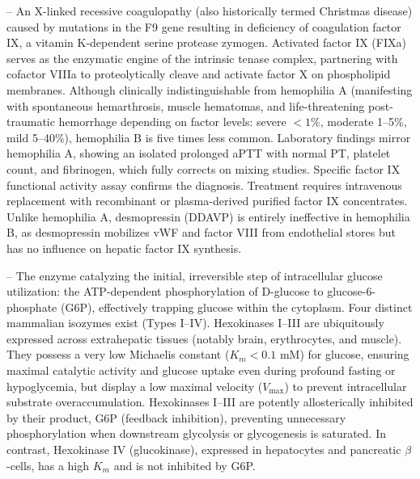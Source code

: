 -- An X-linked recessive coagulopathy (also historically termed Christmas disease) caused by mutations in the F9 gene resulting in deficiency of coagulation factor IX, a vitamin K-dependent serine protease zymogen. Activated factor IX (FIXa) serves as the enzymatic engine of the intrinsic tenase complex, partnering with cofactor VIIIa to proteolytically cleave and activate factor X on phospholipid membranes. Although clinically indistinguishable from hemophilia A (manifesting with spontaneous hemarthrosis, muscle hematomas, and life-threatening post-traumatic hemorrhage depending on factor levels: severe $<1\%$, moderate 1--5\%, mild 5--40\%), hemophilia B is five times less common. Laboratory findings mirror hemophilia A, showing an isolated prolonged aPTT with normal PT, platelet count, and fibrinogen, which fully corrects on mixing studies. Specific factor IX functional activity assay confirms the diagnosis. Treatment requires intravenous replacement with recombinant or plasma-derived purified factor IX concentrates. Unlike hemophilia A, desmopressin (DDAVP) is entirely ineffective in hemophilia B, as desmopressin mobilizes vWF and factor VIII from endothelial stores but has no influence on hepatic factor IX synthesis.

-- The enzyme catalyzing the initial, irreversible step of intracellular glucose utilization: the ATP-dependent phosphorylation of D-glucose to glucose-6-phosphate (G6P), effectively trapping glucose within the cytoplasm. Four distinct mammalian isozymes exist (Types I--IV). Hexokinases I--III are ubiquitously expressed across extrahepatic tissues (notably brain, erythrocytes, and muscle). They possess a very low Michaelis constant ($K_m < 0.1$ mM) for glucose, ensuring maximal catalytic activity and glucose uptake even during profound fasting or hypoglycemia, but display a low maximal velocity ($V_{\max}$) to prevent intracellular substrate overaccumulation. Hexokinases I--III are potently allosterically inhibited by their product, G6P (feedback inhibition), preventing unnecessary phosphorylation when downstream glycolysis or glycogenesis is saturated. In contrast, Hexokinase IV (glucokinase), expressed in hepatocytes and pancreatic $\beta$-cells, has a high $K_m$ and is not inhibited by G6P.

